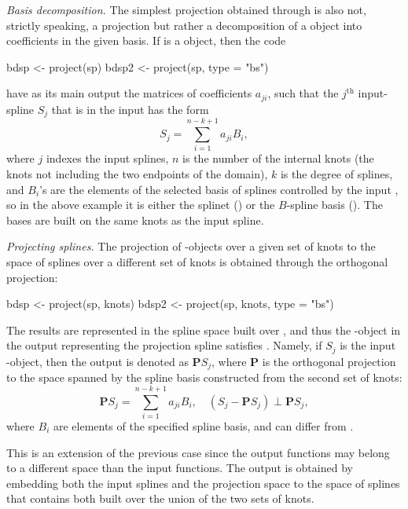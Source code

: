 \noindent\emph{Basis decomposition.} The simplest projection obtained through  is also not, strictly speaking, a projection but rather a decomposition of a  object into coefficients in the given basis. 
If  is a  object, then the code

\begin{example}
bdsp <- project(sp)
bdsp2 <- project(sp, type = "bs")
\end{example}

\noindent have as its main output the matrices of coefficients $a_{ji}$, such that the $j^{\text{th}}$ input-spline $S_j$ that is in the input  has the form
\[
S_j = \sum_{i=1}^{n-k+1} a_{ji} B_{i},
\]
where $j$ indexes the input splines, $n$ is the number of the internal knots (the knots not including the two endpoints of the domain), $k$ is the degree of splines, and $B_{i}$'s are the elements of the selected basis of splines controlled by the input , so in the above example it is either the splinet () or the $B$-spline basis (). 
The bases are built on the same knots as the input spline.

\noindent\emph{Projecting splines.}
The projection of -objects over a given set of knots to the space of splines over a different set of knots is obtained through the orthogonal projection:
\begin{example}
bdsp <- project(sp, knots)
bdsp2 <- project(sp, knots, type = "bs")
\end{example}

\noindent
The results are represented in the spline space built over , and thus the -object in the output representing the projection spline satisfies . 
Namely, if $S_j$ is the input -object, then the output is denoted as $\mathbf{P} S_j$, where $\mathbf{P}$ is the orthogonal projection to the space spanned by the spline basis constructed from the second set of knots:
\begin{equation}\label{projection}
\mathbf{P} S_j = \sum_{i=1}^{n - k + 1} a_{ji} B_i, \quad (S_j - \mathbf{P} S_j) \perp \mathbf{P} S_j,
\end{equation}
where $B_i$ are elements of the specified spline basis, and  can differ from .

This is an extension of the previous case since the output functions may belong to a different space than the input functions.  
The output is obtained by embedding both the input splines and the projection space to the space of splines that contains both built over the union of the two sets of knots.

